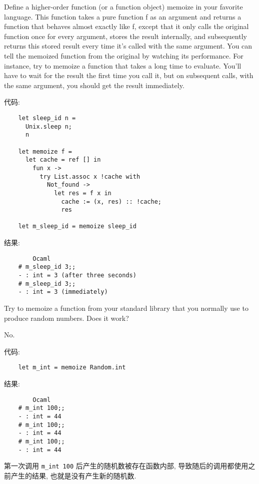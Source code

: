 \documentclass[lang=cn]{elegantbook}
\begin{document}
\begin{exercise}
Define a higher-order function (or a function object) memoize in your favorite language. This function takes a pure function f as an argument and returns a function that behaves almost exactly like f, except that it only calls the original function once for every argument, stores the result internally, and subsequently returns this stored result every time it’s called with the same argument. You can tell the memoized function from the original by watching its performance. For instance, try to memoize a function that takes a long time to evaluate. You’ll have to wait for the result the first time you call it, but on subsequent calls, with the same argument, you should get the result immediately.
\end{exercise}

\begin{solution}

代码:

\begin{verbatim}
    let sleep_id n =
      Unix.sleep n;
      n

    let memoize f =
      let cache = ref [] in
        fun x ->
          try List.assoc x !cache with
            Not_found -> 
              let res = f x in
                cache := (x, res) :: !cache;
                res
    
    let m_sleep_id = memoize sleep_id
\end{verbatim}

结果:

\begin{verbatim}
        Ocaml
    # m_sleep_id 3;;
    - : int = 3 (after three seconds)
    # m_sleep_id 3;;
    - : int = 3 (immediately)
\end{verbatim}

\end{solution}

\begin{exercise}
Try to memoize a function from your standard library that you normally use to produce random numbers. Does it work?
\end{exercise}

\begin{solution}

No.

代码:
\begin{verbatim}
    let m_int = memoize Random.int
\end{verbatim}

结果:
\begin{verbatim}
        Ocaml
    # m_int 100;;
    - : int = 44
    # m_int 100;;
    - : int = 44
    # m_int 100;;
    - : int = 44
\end{verbatim}

第一次调用 \texttt{m_int 100} 后产生的随机数被存在函数内部, 导致随后的调用都使用之前产生的结果, 也就是没有产生新的随机数.

\end{solution}
\end{document}
